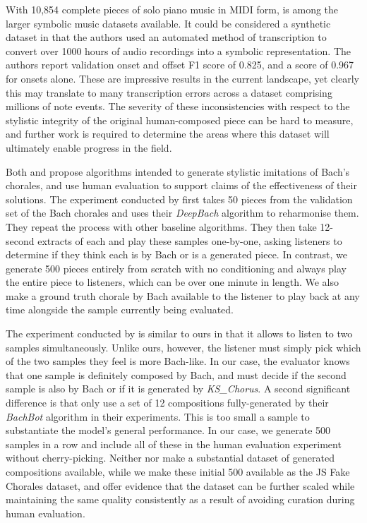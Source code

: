 \documentclass{article}
\begin{document}
With 10,854 complete pieces of solo piano music in MIDI form, \cite{giantmidi} is among the larger symbolic music datasets available. It could be considered a synthetic dataset in that the authors used an automated method of transcription \cite{piano} to convert over 1000 hours of audio recordings into a symbolic representation. The authors report validation onset and offset F1 score of 0.825, and a score of 0.967 for onsets alone. These are impressive results in the current landscape, yet clearly this may translate to many transcription errors across a dataset comprising millions of note events. The severity of these inconsistencies with respect to the stylistic integrity of the original human-composed piece can be hard to measure, and further work is required to determine the areas where this dataset will ultimately enable progress in the field.

Both \cite{deepbach} and \cite{bachbot} propose algorithms intended to generate stylistic imitations of Bach's chorales, and use human evaluation to support claims of the effectiveness of their solutions. The experiment conducted by \cite{deepbach} first takes 50 pieces from the validation set of the Bach chorales and uses their \textit{DeepBach} algorithm to reharmonise them. They repeat the process with other baseline algorithms. They then take 12-second extracts of each and play these samples one-by-one, asking listeners to determine if they think each is by Bach or is a generated piece. In contrast, we generate 500 pieces entirely from scratch with no conditioning and always play the entire piece to listeners, which can be over one minute in length. We also make a ground truth chorale by Bach available to the listener to play back at any time alongside the sample currently being evaluated.

The experiment conducted by \cite{bachbot} is similar to ours in that it allows to listen to two samples simultaneously. Unlike ours, however, the listener must simply pick which of the two samples they feel is more Bach-like. In our case, the evaluator knows that one sample is definitely composed by Bach, and must decide if the second sample is also by Bach or if it is generated by \textit{KS\_Chorus}. A second significant difference is that \cite{bachbot} only use a set of 12 compositions fully-generated by their \textit{BachBot} algorithm in their experiments. This is too small a sample to substantiate the model's general performance. In our case, we generate 500 samples in a row and include all of these in the human evaluation experiment without cherry-picking. Neither \cite{deepbach} nor \cite{bachbot} make a substantial dataset of generated compositions available, while we make these initial 500 available as the JS Fake Chorales dataset, and offer evidence that the dataset can be further scaled while maintaining the same quality consistently as a result of avoiding curation during human evaluation.
\end{document}
